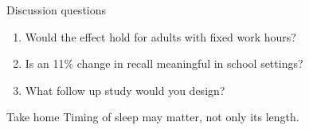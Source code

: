 \documentclass{beamer}
\begin{document}
\begin{frame}{Discussion questions}
  \begin{enumerate}
    \item Would the effect hold for adults with fixed work hours?
    \item Is an 11\% change in recall meaningful in school settings?
    \item What follow up study would you design?
  \end{enumerate}
  \vspace{1em}
  \begin{alertblock}{Take home}
    Timing of sleep may matter, not only its length.
  \end{alertblock}
\end{frame}
\end{document}

